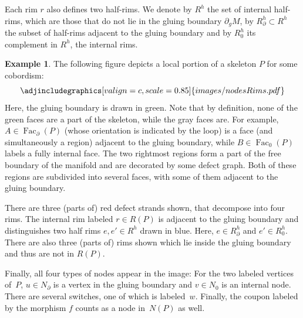\documentclass[10pt,a4paper]{amsart}
\DeclareMathOperator{\Fac}{\mathrm{Fac}}
\numberwithin{equation}{section}
\theoremstyle{definition}
\newtheorem{Example}[Example]{Example}
\begin{document}
Each rim $r$ also defines two half-rims. We denote by $R^h$ the set of internal half-rims, which are those that do not lie in the gluing boundary $\partial_gM$, by $R_{\partial}^h \subset R^h$ the subset of half-rims adjacent to the gluing boundary and by $R_0^h$ its complement in $R^h$, the internal rims.

\begin{Example}
 The following figure depicts a local portion of a skeleton $P$ for some cobordism:
$$
 \adjincludegraphics[valign=c, scale = 0.85]{images/nodesRims.pdf}
$$
 Here, the gluing boundary is drawn in green. Note that by definition, none of the green faces are a part of the skeleton, while the gray faces are. For example, $A \in \Fac_{\partial}(P)$ (whose orientation is indicated by the loop) is a face (and simultaneously a region) adjacent to the gluing boundary, while $B \in \Fac_0(P)$ labels a fully internal face. The two rightmost regions form a part of the free boundary of the manifold and are decorated by some defect graph. Both of these regions are subdivided into several faces, with some of them adjacent to the gluing boundary.

 There are three (parts of) red defect strands shown, that decompose into four rims. The internal rim labeled $r \in R(P)$ is adjacent to the gluing boundary and distinguishes two half rims $e, e' \in R^h$ drawn in blue. Here, $e \in R_{\partial}^h$ and $e' \in R_0^h$. There are also three (parts of) rims shown which lie inside the gluing boundary and thus are not in $R(P)$.

 Finally, all four types of nodes appear in the image: For the two labeled vertices of~$P$, $u \in N_{\partial}$ is a vertex in the gluing boundary and $v \in N_0$ is an internal node. There are several switches, one of which is labeled~$w$. Finally, the coupon labeled by the morphism $f$ counts as a node in~$N(P)$ as well.
\end{Example}
\end{document}
